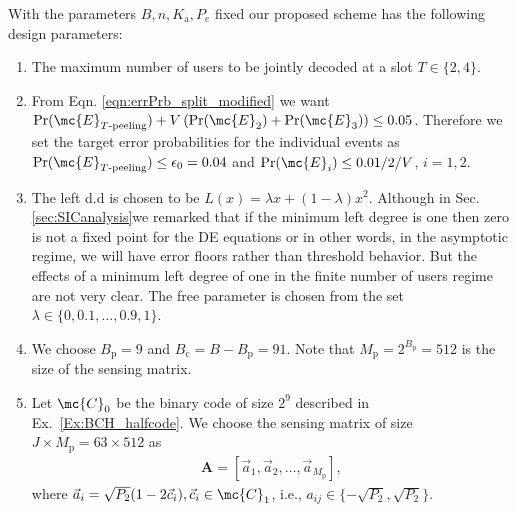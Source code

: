 \documentclass[final,onecolumn,12pt]{IEEEtran}
\def\Ka{K_{\text{a}}}
\def\Pr{\mathrm{Pr}}
\begin{document}
 With the parameters $B,n,\Ka,P_e$ fixed our proposed scheme has the following design parameters:
\begin{enumerate}
\item The maximum number of users to be jointly decoded at a slot $T\in\{2,4\}$.
\item From Eqn. \ref{eqn:errPrb_split_modified} we want $\Pr(\mc{E}_{T\text{-peeling}})+V\left(\Pr(\mc{E}_2)+\Pr(\mc{E}_3)\right)\leq 0.05$. Therefore we set the target error probabilities for the individual events as $\Pr(\mc{E}_{T\text{-peeling}})\leq \epsilon_0=0.04$ and $\Pr(\mc{E}_i)\leq 0.01/2/V$, $i=1,2$.
\item  The left d.d is chosen to be $L(x)=\lambda x+(1-\lambda)x^2$. Although in Sec. \ref{sec:SICanalysis}we remarked that if the minimum left degree is one then zero is not a fixed point for the DE equations or in other words, in the asymptotic regime, we will have error floors rather than threshold behavior. But the effects of a minimum left degree of one in the finite number of users regime are not very clear. The free parameter is chosen from the set $\lambda\in\{0,0.1,\ldots,0.9,1\}$.
\item We choose $B_\mathrm{p}=9$ and $B_\mathrm{c}=B-B_\mathrm{p}=91$. Note that $M_\mathrm{p}=2^{B_\mathrm{p}}=512$ is the size of the sensing matrix.
\item Let $\mc{C}_0$ be the binary code of size $2^9$ described in Ex.~\ref{Ex:BCH_halfcode}.
We choose the sensing matrix of size $J\times M_\mathrm{p}=63\times 512$ as
\begin{align}
\mathbf{A}=[\vec{a}_1,\vec{a}_2,\ldots,\vec{a}_{M_\mathrm{p}}],
\label{eqn:sensingMatrix_defn}
\end{align}
where $\vec{a}_i=\sqrt{P_2}(1-2\vec{c}_i), \vec{c}_i\in\mc{C}_1$, i.e., $a_{ij}\in\{-\sqrt{P_2},\sqrt{P_2}\}$.
\end{enumerate}
\end{document}
